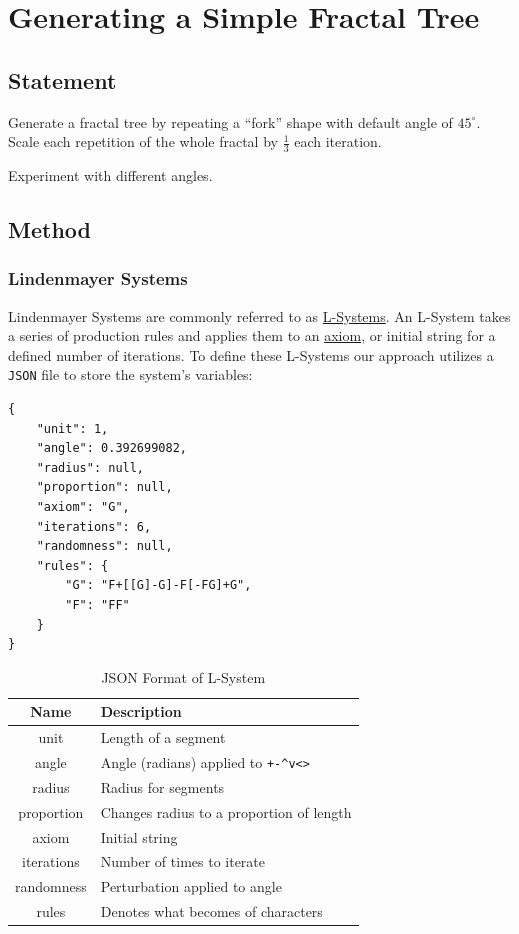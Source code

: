 \section{Generating a Simple Fractal Tree}

\subsection{Statement}

Generate a fractal tree by repeating a ``fork'' shape with default angle of $45^\circ$.
Scale each repetition of the whole fractal by $\frac{1}{3}$ each iteration.

Experiment with different angles.

\subsection{Method}\label{sec:l-system-method}

\subsubsection{Lindenmayer Systems}
Lindenmayer Systems are commonly referred to as 
\href{https://en.wikipedia.org/wiki/L-system}{L-Systems}. An L-System takes a 
series of production rules and applies them to an 
\href{https://en.wikipedia.org/wiki/Axiom}{axiom}, or initial string for a 
defined number of iterations. To define these L-Systems our approach utilizes a 
\texttt{JSON} file to store the system's variables:

\begin{verbatim}
{
    "unit": 1,
    "angle": 0.392699082,
    "radius": null,
    "proportion": null,
    "axiom": "G",
    "iterations": 6,
    "randomness": null,
    "rules": {
        "G": "F+[[G]-G]-F[-FG]+G",
        "F": "FF"
    }
}
\end{verbatim}


\begin{table}
\begin{center}
\begin{tabular}{| c | l |}
    \hline
    \textbf{Name} & \textbf{Description} \\ \hline
    unit & Length of a segment  \\ \hline
    angle & Angle (radians) applied to \verb|+-^v<>|  \\ \hline
    radius & Radius for segments  \\ \hline
    proportion & Changes radius to a proportion of length  \\ \hline
    axiom & Initial string  \\ \hline
    iterations & Number of times to iterate  \\ \hline
    randomness & Perturbation applied to angle  \\ \hline
    rules & Denotes what becomes of characters  \\ \hline
\end{tabular}
\caption{JSON Format of L-System}
\label{table:json_format}
\end{center}
\end{table}

